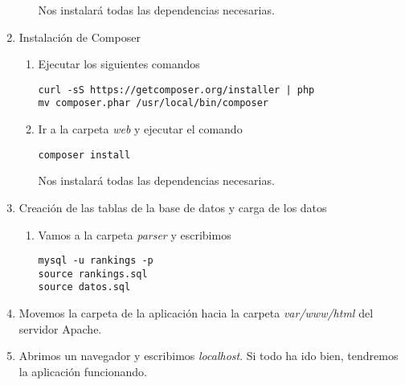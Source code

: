 \begin{enumerate}
\begin{enumerate}
Nos instalará todas las dependencias necesarias.
\end{enumerate}

\item Instalación de Composer

\begin{enumerate}
\item Ejecutar los siguientes comandos

\begin{verbatim}
curl -sS https://getcomposer.org/installer | php
mv composer.phar /usr/local/bin/composer
\end{verbatim} 

\item Ir a la carpeta \emph{web} y ejecutar el comando 

\begin{verbatim}
composer install
\end{verbatim}

Nos instalará todas las dependencias necesarias.

\end{enumerate}

\item Creación de las tablas de la base de datos y carga de los datos

\begin{enumerate}
\item Vamos a la carpeta \emph{parser} y escribimos

\begin{verbatim}
mysql -u rankings -p
source rankings.sql
source datos.sql
\end{verbatim}

\end{enumerate}

\item Movemos la carpeta de la aplicación hacia la carpeta \emph{var/www/html} del servidor Apache.

\item Abrimos un navegador y escribimos \emph{localhost}. Si todo ha ido bien, tendremos la aplicación funcionando.

\end{enumerate}